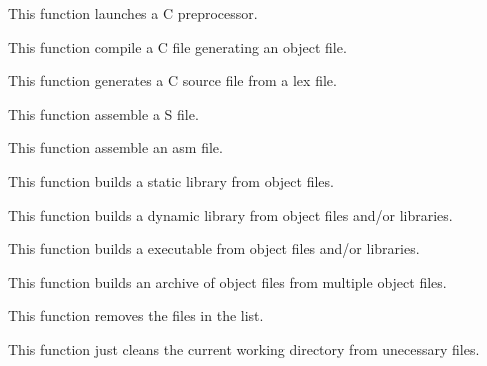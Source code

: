          {
	   This function launches a C preprocessor.
	 }

         {
	   This function compile a C file generating an object file.
	 }

         {
	   This function generates a C source file from a lex file.
	 }

         {
	   This function assemble a S file.
	 }

         {
	   This function assemble an asm file.
	 }

         {
	   This function builds a static library from object files.
	 }

         {
	   This function builds a dynamic library from object files and/or
	   libraries.
	 }

         {
	   This function builds a executable from object files and/or
	   libraries.
	 }

         {
	   This function builds an archive of object files from multiple
	   object files.
	 }

         {
	   This function removes the files in the list.
	 }

         {
	   This function just cleans the current working directory from
	   unecessary files.
	 }


